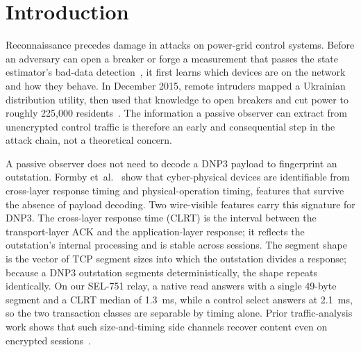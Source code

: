 \section{Introduction}
\label{sec:intro}

Reconnaissance precedes damage in attacks on power-grid control systems. Before an adversary can
open a breaker or forge a measurement that passes the state estimator's bad-data
detection~\cite{liufdia2009}, it first learns which devices are on the network and how they behave. In December 2015, remote intruders mapped a Ukrainian distribution utility, then used that
knowledge to open breakers and cut power to roughly 225{,}000 residents~\cite{ukraine2015}. The
information a passive observer can extract from unencrypted control traffic is therefore an early and
consequential step in the attack chain, not a theoretical concern.

A passive observer does not need to decode a DNP3 payload to fingerprint an outstation. Formby
et~al.~\cite{formby2016} show that cyber-physical devices are identifiable from cross-layer response
timing and physical-operation timing, features that survive the absence of payload decoding. Two
wire-visible features carry this signature for DNP3. The cross-layer response time (CLRT) is the
interval between the transport-layer ACK and the application-layer response; it reflects the
outstation's internal processing and is stable across sessions. The segment shape is the vector of
TCP segment sizes into which the outstation divides a response; because a DNP3 outstation segments
deterministically, the shape repeats identically. On our SEL-751 relay, a native read answers with a
single 49-byte segment and a CLRT median of 1.3~ms, while a control select answers at 2.1~ms, so the
two transaction classes are separable by timing alone. Prior traffic-analysis work shows that such
size-and-timing side channels recover content even on encrypted sessions~\cite{sirinam2018}.

